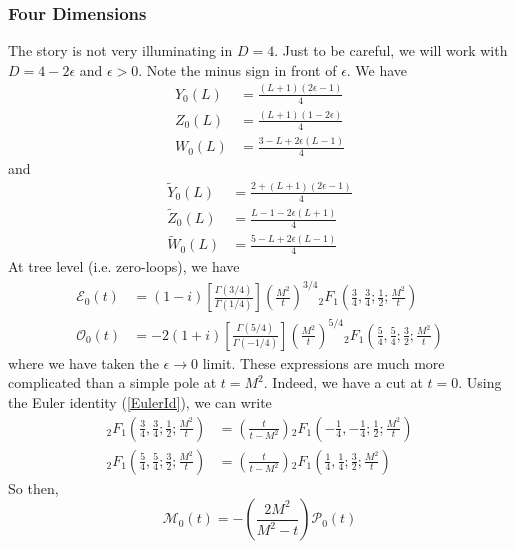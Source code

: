 \subsubsection{Four Dimensions}
The story is not very illuminating in $D = 4$. Just to be careful, we will work with $D = 4 - 2 \epsilon$ and $\epsilon > 0$. Note the minus sign in front of $\epsilon$. We have
\begin{align}
	Y_{0}(L) &= \frac{(L+1)(2 \epsilon - 1)}{4} \\
	Z_{0}(L) &= \frac{(L+1)(1 - 2 \epsilon)}{4} \\
	W_{0}(L) &= \frac{3 - L + 2 \epsilon (L - 1) }{4}
\end{align}
and
\begin{align}
	\tilde{Y}_{0}(L) &= \frac{2 + (L+1)(2 \epsilon - 1)}{4} \\
	\tilde{Z}_{0}(L) &= \frac{L - 1 - 2 \epsilon (L+1)}{4} \\
	\tilde{W}_{0}(L) &= \frac{5 - L + 2 \epsilon (L - 1)}{4}
\end{align}
At tree level (i.e. zero-loops), we have
\begin{align}
	\mathcal{E}_{0}(t) &= (1 - i) \left[ \frac{\Gamma\left( 3/4 \right)}{\Gamma\left( 1/4 \right)} \right] \left( \frac{M^{2}}{t} \right)^{3/4} {}_{2} F_{1} \left( \frac{3}{4}, \frac{3}{4}; \frac{1}{2}; \frac{M^{2}}{t} \right) \\
	\mathcal{O}_{0}(t) &= -2(1 + i) \left[ \frac{\Gamma\left( 5/4 \right)}{\Gamma\left( -1/4 \right)} \right] \left( \frac{M^{2}}{t} \right)^{5/4} {}_{2} F_{1} \left( \frac{5}{4}, \frac{5}{4}; \frac{3}{2}; \frac{M^{2}}{t} \right)
\end{align}
where we have taken the $\epsilon \rightarrow 0$ limit. These expressions are much more complicated than a simple pole at $t = M^{2}$. Indeed, we have a cut at $t = 0$. Using the Euler identity (\ref{EulerId}), we can write
\begin{align}
	{}_{2} F_{1} \left( \frac{3}{4}, \frac{3}{4}; \frac{1}{2}; \frac{M^{2}}{t} \right) &= \left( \frac{t}{t - M^{2}} \right) {}_{2} F_{1} \left(-\frac{1}{4}, -\frac{1}{4}; \frac{1}{2}; \frac{M^{2}}{t} \right) \\
	{}_{2} F_{1} \left( \frac{5}{4}, \frac{5}{4}; \frac{3}{2}; \frac{M^{2}}{t} \right) &= \left( \frac{t}{t - M^{2}} \right) {}_{2} F_{1} \left(\frac{1}{4}, \frac{1}{4}; \frac{3}{2}; \frac{M^{2}}{t} \right)
\end{align}
So then,
\begin{equation}
	\mathcal{M}_{0}(t) = -\left( \frac{2M^{2}}{M^{2} - t} \right) \mathcal{P}_{0}(t)
\end{equation}
